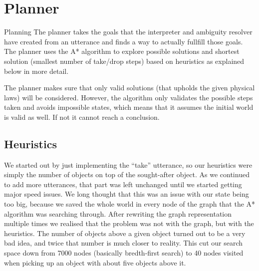 \section*{Planner}
Planning
The planner takes the goals that the interpreter and ambiguity resolver have created from an utterance and finds a way to actually fullfill those goals.
The planner uses the A* algorithm to explore possible solutions and shortest solution (smallest number of take/drop steps) based on heuristics as explained below in more detail.

The planner makes sure that only valid solutions (that upholds the given physical laws) will be considered.
However, the algorithm only validates the possible steps taken and avoids impossible states, which means that it assumes the initial world is valid as well.
If not it cannot reach a conclusion.

\subsection*{Heuristics}
We started out by just implementing the ``take'' utterance, so our heuristics were simply the number of objects on top of the sought-after object.
As we continued to add more utterances, that part was left unchanged until we started getting major speed issues.
We long thought that this was an issue with our state being too big, because we saved the whole world in every node of the graph that the A* algorithm was searching through.
After rewriting the graph representation multiple times we realised that the problem was not with the graph, but with the heuristics.
The number of objects above a given object turned out to be a very bad idea, and twice that number is much closer to reality.
This cut our search space down from 7000 nodes (basically bredth-first search) to 40 nodes visited when picking up an object with about five objects above it.

